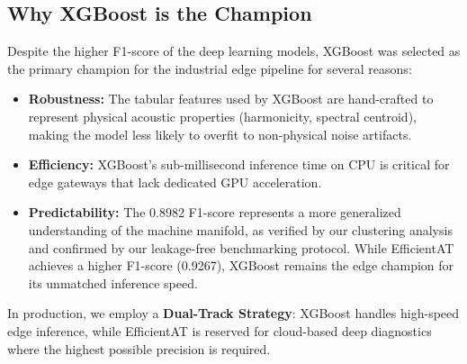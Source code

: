 \subsection{Why XGBoost is the Champion}
Despite the higher F1-score of the deep learning models, XGBoost was selected as the primary champion for the industrial edge pipeline for several reasons:
\begin{itemize}
    \item \textbf{Robustness:} The tabular features used by XGBoost are hand-crafted to represent physical acoustic properties (harmonicity, spectral centroid), making the model less likely to overfit to non-physical noise artifacts.
    \item \textbf{Efficiency:} XGBoost's sub-millisecond inference time on CPU is critical for edge gateways that lack dedicated GPU acceleration.
    \item \textbf{Predictability:} The 0.8982 F1-score represents a more generalized understanding of the machine manifold, as verified by our clustering analysis and confirmed by our leakage-free benchmarking protocol. While EfficientAT achieves a higher F1-score (0.9267), XGBoost remains the edge champion for its unmatched inference speed.
\end{itemize}

In production, we employ a \textbf{Dual-Track Strategy}: XGBoost handles high-speed edge inference, while EfficientAT is reserved for cloud-based deep diagnostics where the highest possible precision is required.
